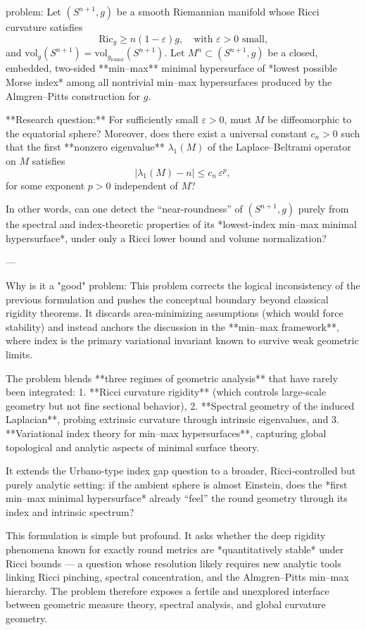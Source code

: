 problem:  
Let \((S^{n+1},g)\) be a smooth Riemannian manifold whose Ricci curvature satisfies  
\[
\mathrm{Ric}_g \ge n(1-\varepsilon)g, \quad \text{with } \varepsilon>0 \text{ small,}
\]
and \(\mathrm{vol}_g(S^{n+1}) = \mathrm{vol}_{g_{\mathrm{round}}}(S^{n+1})\).  
Let \(M^n \subset (S^{n+1},g)\) be a closed, embedded, two-sided **min–max** minimal hypersurface of *lowest possible Morse index* among all nontrivial min–max hypersurfaces produced by the Almgren–Pitts construction for \(g\).  

**Research question:**  
For sufficiently small \(\varepsilon>0\), must \(M\) be diffeomorphic to the equatorial sphere?  
Moreover, does there exist a universal constant \(c_n>0\) such that the first **nonzero eigenvalue** \(\lambda_1(M)\) of the Laplace–Beltrami operator on \(M\) satisfies  
\[
|\lambda_1(M) - n| \le c_n\,\varepsilon^p,
\]
for some exponent \(p>0\) independent of \(M\)?  

In other words, can one detect the “near-roundness” of \((S^{n+1},g)\) purely from the spectral and index-theoretic properties of its *lowest-index min–max minimal hypersurface*, under only a Ricci lower bound and volume normalization?

---

Why is it a "good" problem:  
This problem corrects the logical inconsistency of the previous formulation and pushes the conceptual boundary beyond classical rigidity theorems. It discards area-minimizing assumptions (which would force stability) and instead anchors the discussion in the **min–max framework**, where index is the primary variational invariant known to survive weak geometric limits.  

The problem blends **three regimes of geometric analysis** that have rarely been integrated:
1. **Ricci curvature rigidity** (which controls large-scale geometry but not fine sectional behavior),  
2. **Spectral geometry of the induced Laplacian**, probing extrinsic curvature through intrinsic eigenvalues, and  
3. **Variational index theory for min–max hypersurfaces**, capturing global topological and analytic aspects of minimal surface theory.  

It extends the Urbano‑type index gap question to a broader, Ricci‑controlled but purely analytic setting: if the ambient sphere is almost Einstein, does the *first min–max minimal hypersurface* already “feel” the round geometry through its index and intrinsic spectrum?  

This formulation is simple but profound. It asks whether the deep rigidity phenomena known for exactly round metrics are *quantitatively stable* under Ricci bounds — a question whose resolution likely requires new analytic tools linking Ricci pinching, spectral concentration, and the Almgren–Pitts min–max hierarchy. The problem therefore exposes a fertile and unexplored interface between geometric measure theory, spectral analysis, and global curvature geometry.